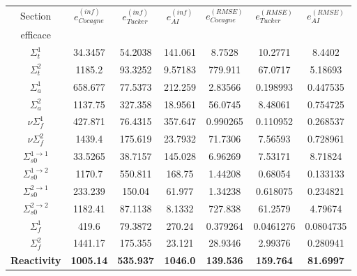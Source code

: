\begin{center}
\begin{table}[!h]
\begin{tabular}{|c||c|c|c||c|c|c|}
		\hline
		Section 													& $e_{Cocagne}^{(inf)}$			& $e_{Tucker}^{(inf)}$			&	$e_{AI}^{(inf)}$			&	$e_{Cocagne}^{(RMSE)}$			& $e_{Tucker}^{(RMSE)}$			&	$e_{AI}^{(RMSE)}$			\\
		efficace													&	&	&	&	&	&	\\
		\hline
		$\Sigma_t^1$											&	34.3457&	54.2038&	141.061&	8.7528&	10.2771&	8.4402 \\
		\hline
		$\Sigma_t^2$											&	1185.2&	 93.3252&	9.57183&	779.911&	67.0717&	5.18693 \\
		\hline
		$\Sigma_a^1$											& 658.677&	77.5373&	212.259&	2.83566&	0.198993&	0.447535 \\
		\hline
		$\Sigma_a^2$											&	1137.75&	 327.358&	18.9561&	56.0745&	8.48061&	0.754725 \\
		\hline
		$\nu\Sigma_f^1$										& 427.871&	 76.4315&	357.647&	0.990265&	0.110952&	0.268537 \\
		\hline
		$\nu\Sigma_f^2$										& 1439.4&	 175.619&	23.7932&	71.7306&	7.56593&	0.728961 \\
		\hline
		$\Sigma_{s0}^{1\rightarrow1}$			& 33.5265&	 38.7157&	145.028&	6.96269&	7.53171&	8.71824 \\
		\hline
		$\Sigma_{s0}^{1\rightarrow2}$			& 1170.7&	550.811&	168.75&	1.44208&	0.68054&	0.133133 \\
		\hline
		$\Sigma_{s0}^{2\rightarrow1}$			& 233.239&	 150.04&	61.977&	1.34238&	0.618075&	0.234821 \\
		\hline
		$\Sigma_{s0}^{2\rightarrow2}$			& 1182.41&	 87.1138&	8.1332&	727.838&	61.2579&	4.79674 \\
		\hline
		$\Sigma_f^1$											& 419.6&	79.3872&	270.24&	0.379264&	0.0461276&	0.0804735 \\
		\hline
		$\Sigma_f^2$											& 1441.17&	175.355&	23.121&	28.9346&	2.99376&	0.280941 \\
		\hline
		\textbf{Reactivity}								& \textbf{1005.14}&	\textbf{535.937}&	\textbf{1046.0}&	\textbf{139.536}&	\textbf{159.764}&	\textbf{81.6997} \\
		\hline
\end{tabular}
\label{table:precisionannexe}
\end{table}
\end{center}


